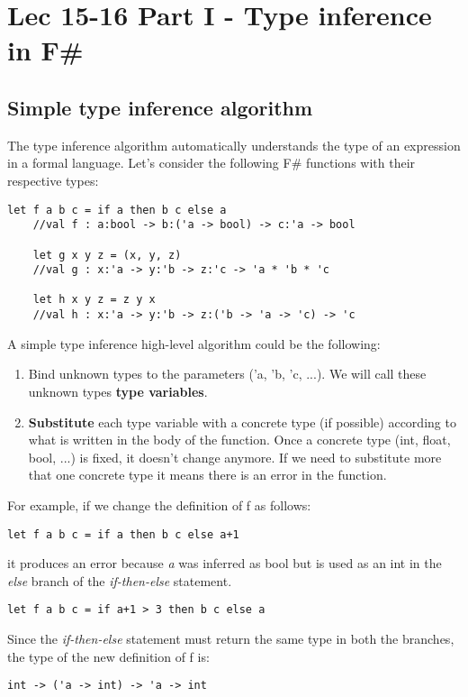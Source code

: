 \chapter{Lec 15-16 Part I - Type inference in F\#}

\section{Simple type inference algorithm}
The type inference algorithm automatically understands the type of an expression in a formal language. Let's consider the following F\# functions with their respective types:
\begin{lstlisting}[style=FSharpStyle]
    let f a b c = if a then b c else a
    //val f : a:bool -> b:('a -> bool) -> c:'a -> bool
    
    let g x y z = (x, y, z)
    //val g : x:'a -> y:'b -> z:'c -> 'a * 'b * 'c

    let h x y z = z y x
    //val h : x:'a -> y:'b -> z:('b -> 'a -> 'c) -> 'c
\end{lstlisting}
A simple type inference high-level algorithm could be the following:
\begin{enumerate}
    \item Bind unknown types to the parameters ('a, 'b, 'c, ...). We will call these unknown types \textbf{type variables}.
    \item \textbf{Substitute} each type variable with a concrete type (if possible) according to what is written in the body of the function. Once a concrete type (int, float, bool, ...) is fixed, it doesn't change anymore. If we need to substitute more that one concrete type it means there is an error in the function.
\end{enumerate}
For example, if we change the definition of f as follows:
\begin{lstlisting}[style=FSharpStyle]
    let f a b c = if a then b c else a+1
\end{lstlisting}
it produces an error because \textit{a} was inferred as bool but is used as an int in the \textit{else} branch of the \textit{if-then-else} statement.
\begin{lstlisting}[style=FSharpStyle]
    let f a b c = if a+1 > 3 then b c else a
\end{lstlisting}
Since the \textit{if-then-else} statement must return the same type in both the branches, the type of the new definition of f is:
\begin{lstlisting}[style=FSharpStyle]
    int -> ('a -> int) -> 'a -> int
\end{lstlisting}
